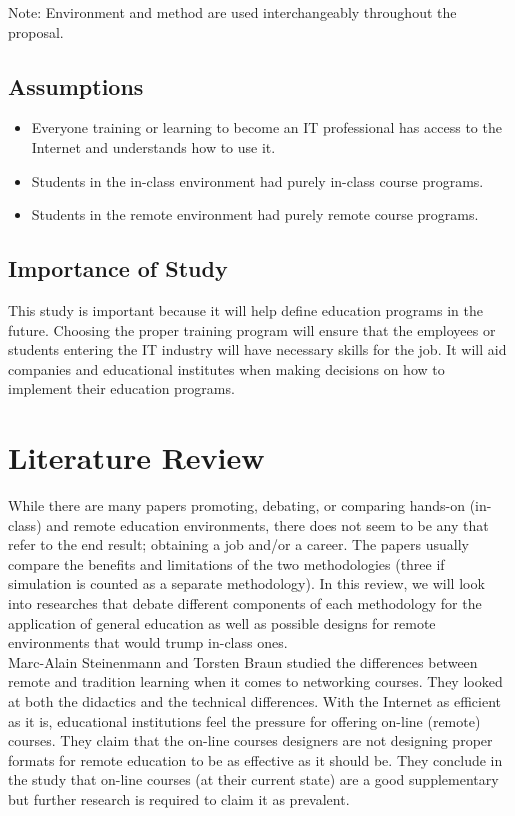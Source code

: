 \documentclass[titlepage]{article}
\begin{document}
Note: Environment and method are used interchangeably throughout the proposal.

\subsection{Assumptions}

\begin{itemize}
	\item Everyone training or learning to become an IT professional has access to the Internet
		  and understands how to use it.
	\item Students in the in-class environment had purely in-class course programs.
	\item Students in the remote environment had purely remote course programs.
\end{itemize}

\subsection{Importance of Study}
This study is important because it will help define education programs in the future.
Choosing the proper training program will ensure that the employees or students entering
the IT industry will have necessary skills for the job.  It will aid companies and
educational institutes when making decisions on how to implement their education programs.

\clearpage

\section{Literature Review}
While there are many papers promoting, debating, or comparing hands-on (in-class) and
remote education environments, there does not seem to be any that refer to the end result;
obtaining a job and/or a career.  The papers usually compare the benefits and limitations of
the two methodologies (three if simulation is counted as a separate methodology).  In this
review, we will look into researches that debate different components of each methodology
for the application of general education as well as possible designs for remote environments
that would trump in-class ones.\\

\noindent Marc-Alain Steinenmann and Torsten Braun \cite{1} studied the differences between remote and
tradition learning when it comes to networking courses.  They looked at both the didactics
and the technical differences.  With the Internet as efficient as it is, educational
institutions feel the pressure for offering on-line (remote) courses.  They claim that the
on-line courses designers are not designing proper formats for remote education to be as
effective as it should be.  They conclude in the study that on-line courses (at their current
state) are a good supplementary but further research is required to claim it as prevalent.\\
\end{document}
